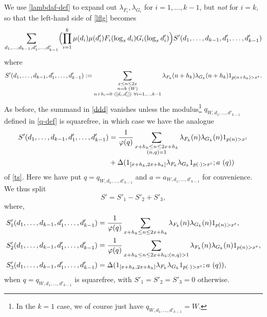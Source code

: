 We use \eqref{lambdaf-def} to expand out $\lambda_{F_{i}}, \lambda_{G_{i}}$ for $i=1,\dots,k-1$, but \emph{not} for $i=k$, so that the left-hand side of \eqref{lflg} becomes
\begin{equation}\label{ddd}
 \sum_{d_1,\dots,d_{k-1},d'_1,\dots,d'_{k-1}} \Bigl(\prod_{i=1}^k \mu(d_{i}) \mu(d'_{i}) F_{i}(\log_x d_{i}) G_{i}(\log_x d'_{i}) \Bigr) S'(d_1,\dots,d_{k-1},d'_1,\dots,d'_{k-1})
\end{equation}
where
$$ S'(d_1,\dots,d_{k-1},d'_1,\dots,d'_{k-1}) := 
 \sum_{\substack{x \leq n \leq 2x\\ n = b\ (W) \\ n + h_{i} = 0\ ([d_{i},d'_{i}])\ \forall i=1,\dots,k-1}}
\hspace{0pt minus 1fil}
 \lambda_{F_k}(n+h_k) \lambda_{G_k}(n+h_k) 1_{p(n+h_k) 
> x^\eps}.
$$
As before, the summand in \eqref{ddd} vanishes unless the modulus\footnote{In the $k=1$ case, we of course just have $q_{W,d_1,\dots,d'_{k-1}} = W$.}
$q_{W,d_1,\dots,d'_{k-1}}$ defined in \eqref{q-def} is squarefree, in which case we have the analogue
\begin{align}\label{tsp}
 S'(d_1,\dots,d_{k-1},d'_1,\dots,d'_{k-1}) &= \frac{1}{\varphi(q)} \sum_{\substack{x+h_k \leq n \leq 2x+h_k\\ (n,q)=1}} \lambda_{F_k}(n) \lambda_{G_k}(n) 1_{p(n)>x^\varepsilon}\nonumber\\
& + \Delta( 1_{[x+h_k,2x+h_k]} \lambda_{F_k} \lambda_{G_k} 1_{p(\cdot) > x^\varepsilon};  a\ (q))
\end{align}
of \eqref{ts}. Here we have put $q=q_{W,d_1,\dots,d'_{k-1}}$ and $a=a_{W,d_1,\dots,d'_{k-1}}$ for convenience. We thus split
$$ S' = S'_1 - S'_2 + S'_3,$$
where,
\begin{align}
 S'_1(d_1,\dots,d_{k-1},d'_1,\dots,d'_{k-1}) &= \frac{1}{\varphi(q)} \sum_{x+h_k \leq n \leq 2x+h_k} \lambda_{F_k}(n) \lambda_{G_k}(n) 1_{p(n)>x^\varepsilon} 
\label{sp1-def},\\
 S'_2(d_1,\dots,d_{k-1},d'_1,\dots,d'_{k-1}) &= \frac{1}{\varphi(q)} \sum_{x+h_k \leq n \leq 2x+h_k; (n,q) > 1} \lambda_{F_k}(n) \lambda_{G_k}(n) 1_{p(n)>x^\varepsilon} 
\label{sp2-def},\\
 S'_3(d_1,\dots,d_{k-1},d'_1,\dots,d'_{k-1}) &= \Delta( 1_{[x+h_k,2x+h_k]} \lambda_{F_k} \lambda_{G_k} 1_{p(\cdot) > x^\varepsilon};  a\ (q)),
\label{sp3-def}
\end{align}
when $q=q_{W,d_1,\dots,d'_{k-1}}$ is squarefree, with $S'_1=S'_2=S'_3=0$ otherwise.

